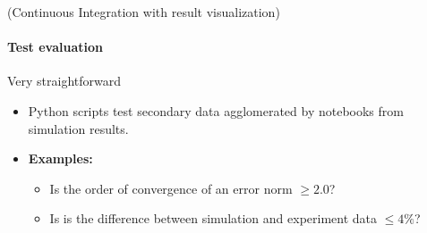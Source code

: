 \begin{frame}{(Continuous Integration with result visualization)} 
    \framesubtitle{Test evaluation}

    \vfill

    Very straightforward 
    \begin{itemize}
        \item Python scripts test secondary data agglomerated by notebooks from simulation results.
        \item \textbf{Examples:} 
            \begin{itemize}
                \item Is the order of convergence of an error norm $\ge 2.0$?
                \item Is is the difference between simulation and experiment data $\le 4\%$? 
            \end{itemize}
    \end{itemize}

\end{frame}


